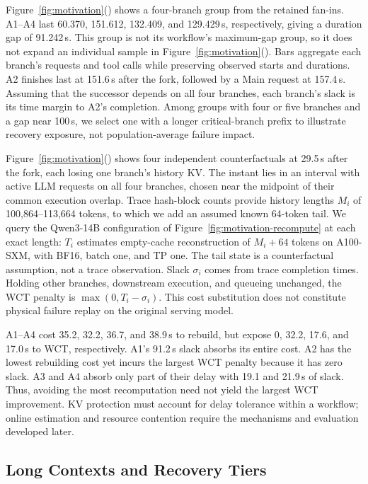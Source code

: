 Figure~\ref{fig:motivation}() shows a
four-branch group from the retained fan-ins. A1--A4 last 60.370, 151.612,
132.409, and 129.429\,s, respectively, giving a duration gap of 91.242\,s.
This group is not its workflow's maximum-gap group, so it does not expand
an individual sample in Figure~\ref{fig:motivation}().
Bars aggregate each branch's requests and tool calls while preserving
observed starts and durations. A2 finishes last at 151.6\,s after the
fork, followed by a Main request at 157.4\,s. Assuming that the successor
depends on all four branches, each branch's slack is its time margin to
A2's completion. Among groups with four or five branches and a gap near
100\,s, we select one with a longer critical-branch prefix to illustrate
recovery exposure, not population-average failure impact.

Figure~\ref{fig:motivation}() shows
four independent counterfactuals at 29.5\,s after the fork, each losing
one branch's history KV. The instant lies in an interval with active LLM
requests on all four branches, chosen near the midpoint of their common
execution overlap. Trace hash-block counts provide history lengths
$M_i$ of 100,864--113,664 tokens, to which we add an assumed known
64-token tail. We query the Qwen3-14B configuration of
Figure~\ref{fig:motivation-recompute} at each exact length: $T_i$ estimates
empty-cache reconstruction of $M_i+64$ tokens on A100-SXM, with BF16,
batch one, and TP one. The tail state is a counterfactual assumption,
not a trace observation. Slack $\sigma_i$ comes from trace completion
times. Holding other branches, downstream execution, and queueing
unchanged, the WCT penalty is $\max(0,T_i-\sigma_i)$.
This cost substitution does not constitute physical failure replay on
the original serving model.

A1--A4 cost 35.2, 32.2, 36.7, and 38.9\,s to rebuild, but expose
0, 32.2, 17.6, and 17.0\,s to WCT, respectively. A1's 91.2\,s slack
absorbs its entire cost. A2 has the lowest rebuilding cost yet incurs
the largest WCT penalty because it has zero slack. A3 and A4 absorb
only part of their delay with 19.1 and 21.9\,s of slack. Thus, avoiding
the most recomputation need not yield the largest WCT improvement.
KV protection must account for delay tolerance within a workflow;
online estimation and resource contention require the mechanisms and
evaluation developed later.

\subsection{Long Contexts and Recovery Tiers}
\label{sec:motivation-long-context}


